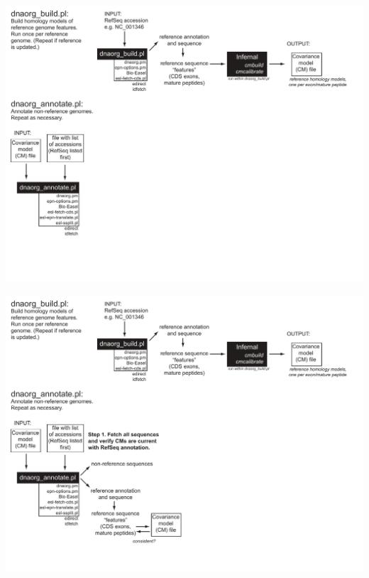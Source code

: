 \documentclass[landscape]{slides}
\begin{document}
\begin{slide}
\begin{center}
\includegraphics[width=10.5in]{figs/dnaorg-scripts-annotate1}
\vfill
\end{center}
\end{slide}
\begin{slide}
\begin{center}
\includegraphics[width=10.5in]{figs/dnaorg-scripts-annotate2}
\vfill
\end{center}
\end{slide}
\end{document}
